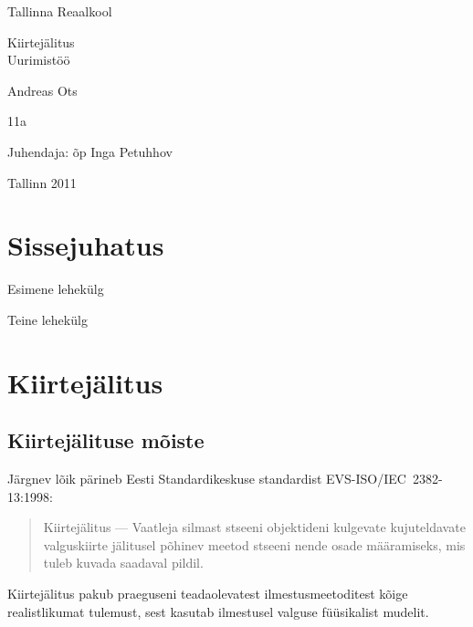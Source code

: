 \documentclass[a4paper,12pt]{report}
\begin{document}
\begin{center}
Tallinna Reaalkool

\vfill

Kiirtejälitus\\
Uurimistöö

\vfill

\end{center}

\begin{raggedleft}

Andreas Ots

11a

Juhendaja: õp Inga Petuhhov

\end{raggedleft}

\vfill

\begin{center}

Tallinn 2011

\end{center}
\clearpage

\tableofcontents
\listoffigures

\chapter*{Sissejuhatus}
\pagestyle{plain}
\thispagestyle{empty}
Esimene lehekülg

\clearpage

Teine lehekülg

\chapter{Kiirtejälitus}
\section{Kiirtejälituse mõiste}
Järgnev lõik pärineb Eesti Standardikeskuse standardist EVS-ISO/IEC~2382-13:1998:
\begin{quote}
Kiirtejälitus --- Vaatleja silmast stseeni objektideni kulgevate
kujuteldavate valguskiirte jälitusel põhinev meetod stseeni nende osade
määramiseks, mis tuleb kuvada saadaval pildil.\cite{ISO:2382-13}
\end{quote}

Kiirtejälitus pakub praeguseni teadaolevatest ilmestusmeetoditest kõige
realistlikumat tulemust, sest kasutab ilmestusel valguse füüsikalist
mudelit.
\end{document}
